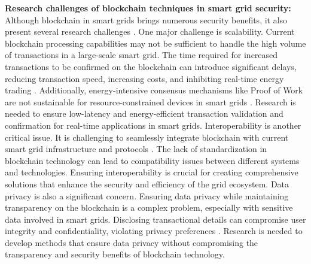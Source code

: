 \documentclass[10pt, journal]{IEEEtran}
\begin{document}
{\bf Research challenges of blockchain techniques in smart grid security:} Although blockchain in smart grids brings numerous security benefits, it also present several research challenges \cite{koukaras2024integrating}. One major challenge is scalability. Current blockchain processing capabilities may not be sufficient to handle the high volume of transactions in a large-scale smart grid. The time required for increased transactions to be confirmed on the blockchain can introduce significant delays, reducing transaction speed, increasing costs, and inhibiting real-time energy trading  \cite{croman2016scaling, mengelkamp2018blockchain, monrat2019survey, agung2022blockchain}. Additionally, energy-intensive consensus mechanisms like Proof of Work are not sustainable for resource-constrained devices in smart grids \cite{vranken2017sustainability, mollah2020blockchain}. Research is needed to ensure low-latency and energy-efficient transaction validation and confirmation for real-time applications in smart grids. Interoperability is another critical issue. It is challenging to seamlessly integrate blockchain with current smart grid infrastructure and protocols  \cite{reyna2018blockchain, mollah2020blockchain}. The lack of standardization in blockchain technology can lead to compatibility issues between different systems and technologies. Ensuring interoperability is crucial for creating comprehensive solutions that enhance the security and efficiency of the grid ecosystem. Data privacy is also a significant concern. Ensuring data privacy while maintaining transparency on the blockchain is a complex problem, especially with sensitive data involved in smart grids. Disclosing transactional details can compromise user integrity and confidentiality, violating privacy preferences  \cite{mollah2020blockchain}. Research is needed to develop methods that ensure data privacy without compromising the transparency and security benefits of blockchain technology.


\end{document}
